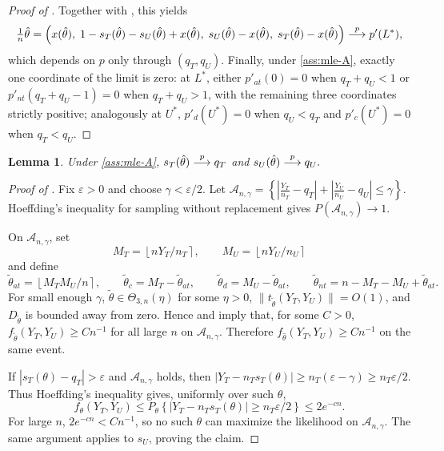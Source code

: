 \documentclass[12pt,reqno]{amsart}
\theoremstyle{theorem}
\newtheorem{lem}{Lemma}[section]
\theoremstyle{definition}
\newcommand{\0}{\mathbf{0}}
\newcommand{\1}{\mathbf{1}}
\begin{document}
\begin{proof}[Proof of ]
Together with , this yields
\[
\tfrac{1}{n}\hat\theta
=
\left(x(\hat\theta),\; 1 - s_T(\hat\theta) - s_U(\hat\theta) + x(\hat\theta),\; s_U(\hat\theta) - x(\hat\theta),\; s_T(\hat\theta) - x(\hat\theta)\right)
\overset{p}{\longrightarrow}
p'(L^*),
\]
which depends on \(p\) only through \((q_T,q_U)\).
Finally, under \eqref{ass:mle-A}, exactly one coordinate of the limit is zero: at \(L^*\), either \(p'_{at}(0)=0\) when \(q_T+q_U<1\) or \(p'_{nt}(q_T{+}q_U{-}1)=0\) when \(q_T+q_U>1\), with the remaining three coordinates strictly positive; analogously at \(U^*\), \(p'_d(U^*)=0\) when \(q_U<q_T\) and \(p'_c(U^*)=0\) when \(q_T<q_U\).
\end{proof}

\begin{lem}\label{lem:mle-margin-consistency}
Under \eqref{ass:mle-A},
$
s_T(\hat\theta)\overset{p}{\longrightarrow} q_T$ and $
s_U(\hat\theta)\overset{p}{\longrightarrow} q_U.
$
\end{lem}

\begin{proof}[Proof of ]
Fix \(\varepsilon>0\) and choose \(\gamma<\varepsilon/2\).  Let
\(
\mathcal A_{n,\gamma}
=
\left\{
\left|\frac{Y_T}{n_T}-q_T\right|
+
\left|\frac{Y_U}{n_U}-q_U\right|
\le \gamma
\right\}.
\)
Hoeffding's inequality for sampling without replacement gives
\(P(\mathcal A_{n,\gamma})\to1\).

On \(\mathcal A_{n,\gamma}\), set
\[
M_T=\left\lfloor nY_T/n_T\right\rceil,\qquad
M_U=\left\lfloor nY_U/n_U\right\rceil
\]
and define
\[
\tilde\theta_{at}=\left\lfloor M_TM_U/n\right\rceil,\qquad
\tilde\theta_c=M_T-\tilde\theta_{at},\qquad
\tilde\theta_d=M_U-\tilde\theta_{at},
\qquad
\tilde\theta_{nt}=n-M_T-M_U+\tilde\theta_{at}.
\]
For small enough \(\gamma\), \(\tilde\theta\in\Theta_{3,n}(\eta)\) for some
\(\eta>0\), \(\|t_{\tilde\theta}(Y_T,Y_U)\|=O(1)\), and
\(D_{\tilde\theta}\) is bounded away from zero.  Hence
 and  imply that, for some
\(C>0\),
\(
f_{\tilde\theta}(Y_T,Y_U)\ge Cn^{-1}
\)
for all large \(n\) on \(\mathcal A_{n,\gamma}\).  Therefore
\(f_{\hat\theta}(Y_T,Y_U)\ge Cn^{-1}\) on the same event.

If \(|s_T(\theta)-q_T|>\varepsilon\) and \(\mathcal A_{n,\gamma}\) holds, then
\(
\left|Y_T-n_Ts_T(\theta)\right|\ge n_T(\varepsilon-\gamma)\ge n_T\varepsilon/2.
\)
Thus Hoeffding's inequality gives, uniformly over such \(\theta\),
\[
f_\theta(Y_T,Y_U)
\le
P_\theta\left\{|Y_T-n_Ts_T(\theta)|\ge n_T\varepsilon/2\right\}
\le 2e^{-cn}.
\]
For large \(n\), \(2e^{-cn}<Cn^{-1}\), so no such \(\theta\) can maximize the
likelihood on \(\mathcal A_{n,\gamma}\).  The same argument applies to
\(s_U\), proving the claim.
\end{proof}
\end{document}
